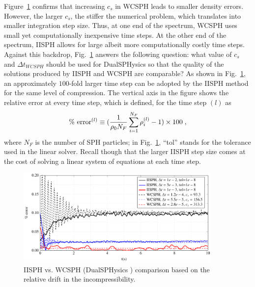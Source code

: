 Figure~\ref{fig:Compressibility_Comparison} confirms that increasing $c_s$ in WCSPH leads to smaller density errors. However, the larger $c_s$, the stiffer the numerical problem, which translates into smaller integration step size. Thus, at one end of the spectrum, WCSPH uses small yet computationally inexpensive time steps. At the other end of the spectrum, IISPH allows for large albeit more computationally costly time steps. Against this backdrop, Fig.~\ref{fig:Compressibility_Comparison} answers the following question: what value of $c_s$ and $\Delta t_{WCSPH}$ should be used for DualSPHysics so that the quality of the solutions produced by IISPH and WCSPH are comparable? As shown in Fig.~\ref{fig:Compressibility_Comparison}, an approximately $100$-fold larger time step can be adopted by the IISPH method for the same level of compression. The vertical axis in the figure shows the relative error at every time step, which is defined, for the time step $(l)$ as
\[
\% \mbox{ error}^{(l)}  \equiv (\frac{1}{\rho_0 {N_F} } \sum_{i=1}^{{N_F}} \rho_i^{(l)} -1) \times 100 \; ,
\]
\noindent where $N_F$ is the number of SPH particles; in Fig.~\ref{fig:Compressibility_Comparison}, ``tol'' stands for the tolerance used in the linear solver. Recall though that the larger IISPH step size comes at the cost of solving a linear system of equations at each time step.
%
\begin{figure}[H]
	\begin{center}
		\includegraphics[width=0.9\textwidth]{images/IISPH/tikz/Compressibility.png}
	\end{center}
	\caption{IISPH vs. WCSPH (DualSPHysics \cite{crespo2015dualsphysics}) comparison based on the relative drift in the incompressibility.}
	\label{fig:Compressibility_Comparison}
\end{figure}

